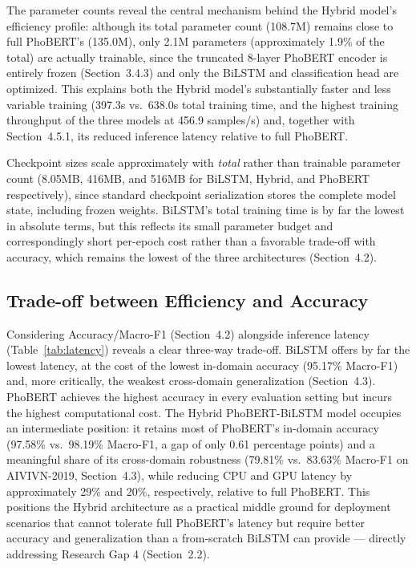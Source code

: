 \documentclass[12pt]{report} %
\begin{document}
The parameter counts reveal the central mechanism behind the Hybrid model's
efficiency profile: although its total parameter count (108.7M) remains close
to full PhoBERT's (135.0M), only 2.1M parameters (approximately 1.9\% of the
total) are actually trainable, since the truncated 8-layer PhoBERT encoder is
entirely frozen (Section~3.4.3) and only the BiLSTM and classification head
are optimized. This explains both the Hybrid model's substantially faster and
less variable training (397.3s vs.\ 638.0s total training time, and the
highest training throughput of the three models at 456.9 samples/s) and,
together with Section~4.5.1, its reduced inference latency relative to full
PhoBERT.

Checkpoint sizes scale approximately with \emph{total} rather than trainable
parameter count (8.05MB, 416MB, and 516MB for BiLSTM, Hybrid, and PhoBERT
respectively), since standard checkpoint serialization stores the complete
model state, including frozen weights. BiLSTM's total training time is by far
the lowest in absolute terms, but this reflects its small parameter budget and
correspondingly short per-epoch cost rather than a favorable trade-off with
accuracy, which remains the lowest of the three architectures
(Section~4.2).

\subsection{Trade-off between Efficiency and Accuracy}
Considering Accuracy/Macro-F1 (Section~4.2) alongside inference latency (Table~\ref{tab:latency}) reveals a clear three-way trade-off. BiLSTM offers by far the lowest latency, at the cost of the lowest in-domain accuracy (95.17\% Macro-F1) and, more critically, the weakest cross-domain generalization (Section~4.3). PhoBERT achieves the highest accuracy in every evaluation setting but incurs the highest computational cost. The Hybrid PhoBERT-BiLSTM model occupies an intermediate position: it retains most of PhoBERT's in-domain accuracy (97.58\% vs.\ 98.19\% Macro-F1, a gap of only 0.61 percentage points) and a meaningful share of its cross-domain robustness (79.81\% vs.\ 83.63\% Macro-F1 on AIVIVN-2019, Section~4.3), while reducing CPU and GPU latency by approximately 29\% and 20\%, respectively, relative to full PhoBERT. This positions the Hybrid architecture as a practical middle ground for deployment scenarios that cannot tolerate full PhoBERT's latency but require better accuracy and generalization than a from-scratch BiLSTM can provide --- directly addressing Research Gap 4 (Section~2.2).
\end{document}
